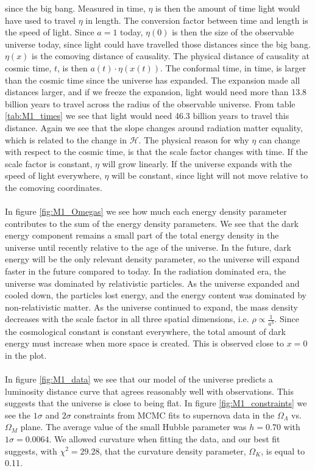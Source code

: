 \documentclass{aa}
\begin{document}
since the big bang. Measured in time, $\eta$ is then the amount of time light would have used to travel $\eta$ in length. The conversion factor between time and length is the speed of light.
Since $a=1$ today, $\eta(0)$ is then the size of the observable universe today, since light could have travelled those distances since the big bang. $\eta(x)$ is the comoving distance of causality.
The physical distance of causality at cosmic time, $t$, is then $a(t)\cdot \eta(x(t))$. The conformal time, in time, is larger than the cosmic time since the universe has expanded.
The expansion made all distances larger, and if we freeze the expansion, light would need more than 13.8 billion years to travel across the radius of the observable universe.
From table \ref{tab:M1_times} we see that light would need 46.3 billion years to travel this distance. Again we see that the slope changes around radiation matter equality, which is related to the change in $\mathcal{H}$.
The physical reason for why $\eta$ can change with respect to the cosmic time, is that the scale factor changes with time. If the scale factor is constant, $\eta$ will grow linearly. If the 
universe expands with the speed of light everywhere, $\eta$ will be constant, since light will not move relative to the comoving coordinates.\\
\\
In figure \ref{fig:M1_Omegas} we see how much each energy density parameter contributes to the sum of the energy density parameters. We see that the dark energy component
remains a small part of the total energy density in the universe until recently relative to the age of the universe. In the future, dark energy will be the only relevant density parameter,
so the universe will expand faster in the future compared to today. In the radiation dominated era, the universe was dominated by relativistic particles. As the universe
expanded and cooled down, the particles lost energy, and the energy content was dominated by non-relativistic matter. As the universe continued to expand, the mass density
decreases with the scale factor in all three spatial dimensions, i.e. $\rho \propto \frac{1}{a^3}$. Since the cosmological constant is constant everywhere, the total amount of dark energy
must increase when more space is created. This is observed close to $x=0$ in the plot.\\
\\
In figure \ref{fig:M1_data} we see that our model of the universe predicts a luminosity distance curve that agrees reasonably well with observations. This suggests that the universe is close to being flat.
In figure \ref{fig:M1_constraints} we see the $1\sigma$ and $2\sigma$ constraints from MCMC fits to supernova data in the $\Omega_\Lambda$ vs. $\Omega_M$ plane. 
The average value of the small Hubble parameter was $h= 0.70$ with $1\sigma = 0.0064$. We allowed curvature when fitting the data, and our best fit suggests, with $\chi^2=29.28$, that the curvature density parameter, $\Omega_K$,
is equal to 0.11.  
\end{document}
